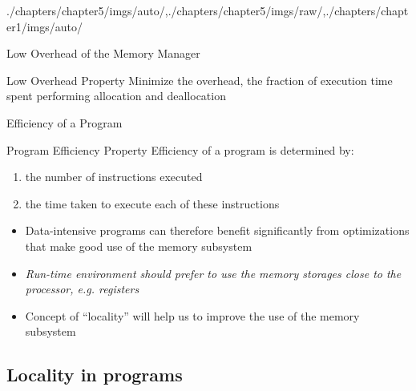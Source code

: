 \begin{graphicspathcontext}{{./chapters/chapter5/imgs/auto/},{./chapters/chapter5/imgs/raw/},{./chapters/chapter1/imgs/auto/}}
\begin{bibunit}[apalike]
\begin{frame}{{Low Overhead} of the Memory Manager}
	\vspace{.5cm}
	\begin{definitionblock}{Low Overhead Property}
		Minimize the overhead, the fraction of execution time spent performing allocation and deallocation
	\end{definitionblock}
	\vspace{.5cm}
\end{frame}

\begin{frame}{Efficiency of a Program}
	\begin{definitionblock}{Program Efficiency Property}
		Efficiency of a program is determined by:
		\begin{enumerate}
			\item the number of instructions executed
			\item the time taken to execute each of these instructions
		\end{enumerate}
	\end{definitionblock}
	\begin{itemize}
		\item Data-intensive programs can therefore benefit significantly from optimizations that make good use of the memory subsystem
		\vfill
		\item \emph{Run-time environment should prefer to use the memory storages close to the processor, e.g. registers}
		\vfill
		\item Concept of ``locality'' will help us to improve the use of the memory subsystem
	\end{itemize}
\end{frame}

\subsection{Locality in programs}
\subsectiontableofcontentslide


\end{bibunit}
\end{graphicspathcontext}
